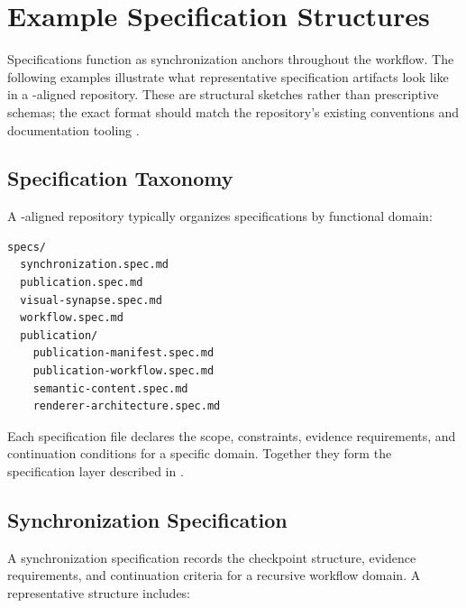 
\section{Example Specification Structures}
\label{sec:appendix-specs}

Specifications function as synchronization anchors throughout the  workflow. The following examples illustrate what representative specification artifacts look like in a -aligned repository. These are structural sketches rather than prescriptive schemas; the exact format should match the repository's existing conventions and documentation tooling \cite{Parnas1972Modularization}.

\subsection{Specification Taxonomy}

A -aligned repository typically organizes specifications by functional domain:

\begin{lstlisting}[language=bash, caption={Example specification directory structure.}, label={lst:spec-dir}]
specs/
  synchronization.spec.md
  publication.spec.md
  visual-synapse.spec.md
  workflow.spec.md
  publication/
    publication-manifest.spec.md
    publication-workflow.spec.md
    semantic-content.spec.md
    renderer-architecture.spec.md
\end{lstlisting}

Each specification file declares the scope, constraints, evidence requirements, and continuation conditions for a specific domain. Together they form the specification layer described in .

\subsection{Synchronization Specification}

A synchronization specification records the checkpoint structure, evidence requirements, and continuation criteria for a recursive workflow domain. A representative structure includes:

